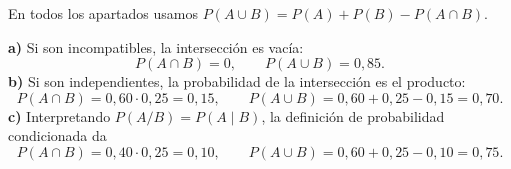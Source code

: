 En todos los apartados usamos $P(A\cup B)=P(A)+P(B)-P(A\cap B)$.

\textbf{a)} Si son incompatibles, la intersección es vacía:
\[
 P(A\cap B)=\boxed{0},\qquad P(A\cup B)=\boxed{0{,}85}.
\]
\textbf{b)} Si son independientes, la probabilidad de la intersección es el producto:
\[
 P(A\cap B)=0{,}60\cdot0{,}25=\boxed{0{,}15},
 \qquad P(A\cup B)=0{,}60+0{,}25-0{,}15=\boxed{0{,}70}.
\]
\textbf{c)} Interpretando $P(A/B)=P(A\mid B)$, la definición de probabilidad condicionada da
\[
 P(A\cap B)=0{,}40\cdot0{,}25=\boxed{0{,}10},
 \qquad P(A\cup B)=0{,}60+0{,}25-0{,}10=\boxed{0{,}75}.
\]
